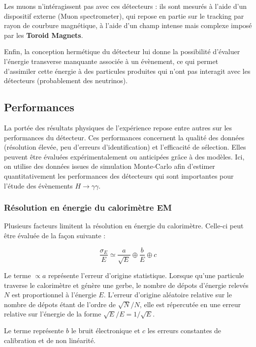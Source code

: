 \documentclass[11pt]{article} %
\begin{document}
Les muons n'intéragissent pas avec ces détecteurs : ils sont mesurés à l'aide d'un dispositif externe (Muon spectrometer), qui repose en partie sur le tracking par rayon de courbure magnétique, à l'aide d'un champ intense mais complexe imposé par les \textbf{Toroid Magnets}.

Enfin, la conception hermétique du détecteur lui donne la possibilité d'évaluer l'énergie transverse manquante associée à un évènement, ce qui permet d'assimiler cette énergie à des particules produites qui n'ont pas interagit avec les détecteurs (probablement des neutrinos).

\subsection{Performances}

La portée des résultats physiques de l'expérience repose entre autres sur les performances du détecteur. Ces performances concernent la qualité des données (résolution élevée, peu d'erreurs d'identification) et l'efficacité de sélection. Elles peuvent être évaluées expérimentalement ou anticipées grâce à des modèles. Ici, on utilise des données issues de simulation Monte-Carlo afin d'estimer quantitativement les performances des détecteurs qui sont importantes pour l'étude des évènements $H \to \gamma \gamma$.

\subsubsection{Résolution en énergie du calorimètre EM}

Plusieurs facteurs limitent la résolution en énergie du calorimètre. Celle-ci peut être évaluée de la façon suivante :

\begin{equation}
\dfrac{\sigma_E}{E} \simeq \dfrac{a}{\sqrt{E}} \oplus \dfrac{b}{E} \oplus c
\end{equation}

Le terme $\propto a$ représente l'erreur d'origine statistique. Lorsque qu'une particule traverse le calorimètre et génère une gerbe, le nombre de dépots d'énergie relevés $N$ est proportionnel à l'énergie $E$. L'erreur d'origine aléatoire relative sur le nombre de dépots étant de l'ordre de $\sqrt{N}/N$, elle est répercutée en une erreur relative sur l'énergie de la forme $\sqrt{E}/E = 1/\sqrt{E}$.

Le terme représente $b$ le bruit électronique et $c$ les erreurs constantes de calibration et de non linéarité.
\end{document}
